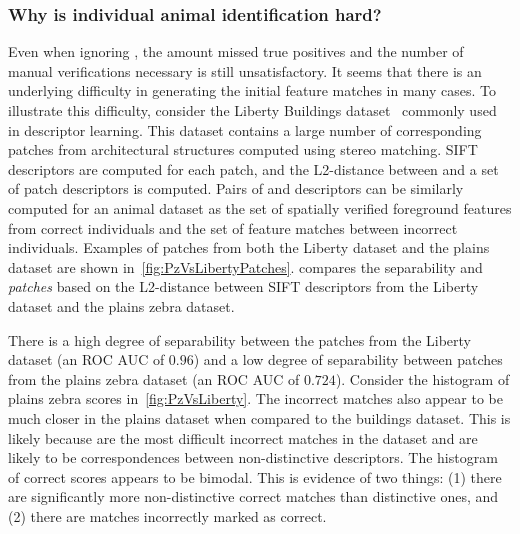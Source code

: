     \subsubsection{Why is individual animal identification hard?}\label{sub:whyhard}
        Even when ignoring \photobombings{}, the amount missed true
          positives and the number of manual verifications necessary is
          still unsatisfactory.
        It seems that there is an underlying difficulty in generating
          the initial feature matches in many cases.
        To illustrate this difficulty, consider the Liberty Buildings
          dataset~\cite{brown_discriminative_2011} commonly used in
          descriptor learning.
        This dataset contains a large number of corresponding patches
          from architectural structures computed using stereo matching.
        SIFT descriptors are computed for each patch, and the
          L2-distance between \groundtrue{} and a set of \groundfalse{}
          patch descriptors is computed.
        Pairs of \groundtrue{} and \groundfalse{} descriptors can be
          similarly computed for an animal dataset as the set of
          spatially verified foreground features from correct individuals
          and the set of feature matches between incorrect individuals.
        Examples of patches from both the Liberty dataset and the
          plains dataset are shown in~\cref{fig:PzVsLibertyPatches}.
         compares the separability \groundtrue{}
          and \groundfalse{} \emph{patches} based on the L2-distance
          between SIFT descriptors from the Liberty dataset and the
          plains zebra dataset.

        There is a high degree of separability between the patches from
          the Liberty dataset (an ROC AUC of $0.96$) and a low degree of
          separability between patches from the plains zebra dataset (an
          ROC AUC of $0.724$).
        Consider the histogram of plains zebra scores
          in~\cref{fig:PzVsLiberty}.
        The incorrect matches also appear to be much closer in the
          plains dataset when compared to the buildings dataset.
        This is likely because are the most difficult incorrect matches
          in the dataset and are likely to be correspondences between
          non-distinctive descriptors.
        The histogram of correct scores appears to be bimodal.
        This is evidence of two things:
        (1) there are significantly more non-distinctive correct
          matches than distinctive ones, and
        (2) there are matches incorrectly marked as correct.

